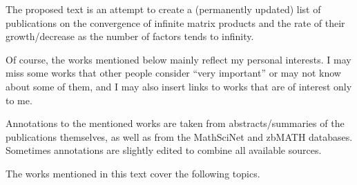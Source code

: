 %
The proposed text is an attempt to create a (permanently updated) list of publications on the convergence of infinite matrix products and the rate of their growth/decrease as the number of factors tends to infinity.

Of course, the works mentioned below mainly reflect my personal interests. I may miss some works that other people consider ``very important'' or may not know about some of them, and I may also insert links to works that are of interest only to me.

Annotations to the mentioned works are taken from abstracts/summaries of the publications themselves, as well as from the MathSciNet and zbMATH databases. Sometimes annotations are slightly edited to combine all available sources.

The works mentioned in this text cover the following topics.

